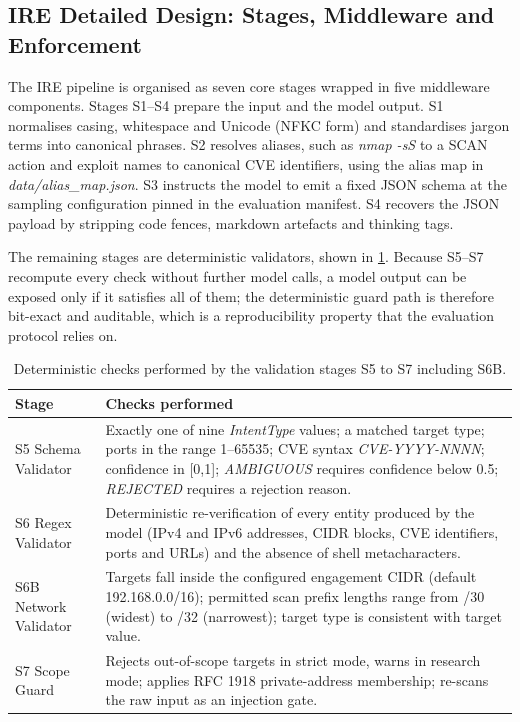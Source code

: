 \subsection{IRE Detailed Design: Stages, Middleware and Enforcement}\label{sec:method-ire-design}

The IRE pipeline is organised as seven core stages wrapped in five middleware
components. Stages S1--S4 prepare the input and the model output. S1 normalises
casing, whitespace and Unicode (NFKC form) and standardises jargon terms into
canonical phrases. S2 resolves aliases, such as \emph{nmap -sS} to a SCAN action
and exploit names to canonical CVE identifiers, using the alias map in
\emph{data/alias\_map.json}. S3 instructs the model to emit a fixed JSON schema
at the sampling configuration pinned in the evaluation manifest. S4 recovers the
JSON payload by stripping code fences, markdown artefacts and thinking tags.

The remaining stages are deterministic validators, shown in
\cref{tab:ire-validators}. Because S5--S7 recompute every check without further
model calls, a model output can be exposed only if it satisfies all of them; the
deterministic guard path is therefore bit-exact and auditable, which is a
reproducibility property that the evaluation protocol relies on.

\begin{table}[htbp]
  \centering
  \begin{tabular}{@{}p{}p{}@{}}
    \toprule
    \textbf{Stage} & \textbf{Checks performed}\\
    \midrule
    S5 Schema Validator & Exactly one of nine \emph{IntentType} values; a matched target type; ports in the range 1--65535; CVE syntax \emph{CVE-YYYY-NNNN}; confidence in {[}0,1{]}; \emph{AMBIGUOUS} requires confidence below 0.5; \emph{REJECTED} requires a rejection reason.\\
    S6 Regex Validator & Deterministic re-verification of every entity produced by the model (IPv4 and IPv6 addresses, CIDR blocks, CVE identifiers, ports and URLs) and the absence of shell metacharacters.\\
    S6B Network Validator & Targets fall inside the configured engagement CIDR (default 192.168.0.0/16); permitted scan prefix lengths range from /30 (widest) to /32 (narrowest); target type is consistent with target value.\\
    S7 Scope Guard & Rejects out-of-scope targets in strict mode, warns in research mode; applies RFC 1918 private-address membership; re-scans the raw input as an injection gate.\\
    \bottomrule
  \end{tabular}
  \caption{Deterministic checks performed by the validation stages S5 to S7
  including S6B.}\label{tab:ire-validators}
\end{table}

